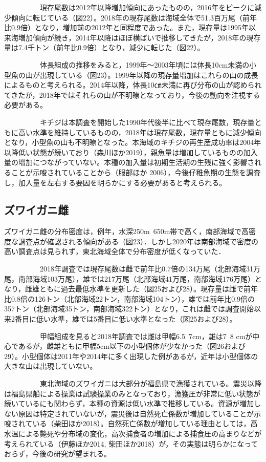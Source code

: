 \documentclass[11pt]{article} %
\begin{document}
\begin{linenumbers}
\ \ \ \ \ \ \ \ \ \ 
現存尾数は2012年以降増加傾向にあったものの，2016年をピークに減少傾向に転じている（図22）。2018年の現存尾数は海域全体で51.3百万尾（前年比0.9倍）となり，増加前の2012年と同程度であった。また，現存量は1995年以来海増加傾向が続き，2014年以降はほぼ横ばいで推移してきたが，2018年の現存量は7.4千トン（前年比0.9倍）となり，減少に転じた（図22）。

\ \ \ \ \ \ \ \ \ \ 
体長組成の推移をみると，1999年～2003年頃には体長10cm未満の小型魚の山が出現している（図23）。1999年以降の現存量増加はこれらの山の成長によるものと考えられる。2014年以降，体長10㎝未満に再び分布の山が認められてきたが，2018年ではそれらの山が不明瞭となっており，今後の動向を注視する必要がある。

\ \ \ \ \ \ \ \ \ \ 
キチジは本調査を開始した1990年代後半に比べて現存尾数，現存量ともに高い水準を維持しているものの，2018年は現存尾数，現存量ともに減少傾向となり，小型魚の山も不明瞭となった。本海域のキチジの再生産成功率は2004年以降低い状態が続いており（森川ほか2019），親魚量は増加しているものの加入量の増加につながっていない。本種の加入量は初期生活期の生残に強く影響されることが示唆されていることから（服部ほか 2006），今後仔稚魚期の生態を調査し，加入量を左右する要因を明らかにする必要があると考えられる。

\subsection{ズワイガニ雌}
ズワイガニ雌の分布密度は，例年，水深250m~650m帯で高く，南部海域で高密度な調査点が確認される傾向がある（図23）．しかし2020年は南部海域で密度の高い調査点は見られず，東北海域全体で分布密度が低くなっていた．

\ \ \ \ \ \ \ \ \ \ 
2018年調査では現存尾数は雌で前年比0.7倍の134万尾（北部海域31万尾，南部海域103万尾），雄では217万尾（北部海域41万尾，南部海域176万尾）となり，雌雄ともに過去最低水準を更新した（図25および28）。現存量は雌で前年比0.8倍の126トン（北部海域22トン，南部海域104トン），雄では前年比0.9倍の357トン（北部海域35トン，南部海域322トン）となり，これは雌では調査開始以来2番目に低い水準，雄では5番目に低い水準となった（図25および28）。

\ \ \ \ \ \ \ \ \ \ 
甲幅組成を見ると2018年調査では雌は甲幅6.5~7cm，雄は7~8 cmが中心であるが，雌雄ともに甲幅5cm以下の小型個体が少なかった（図26および29）。小型個体は2011年や2014年に多く出現した例があるが，近年は小型個体の大きな山は出現していない。

\ \ \ \ \ \ \ \ \ \ 
東北海域のズワイガニは大部分が福島県で漁獲されている。震災以降は福島県船による操業は試験操業のみとなっており，漁獲圧が非常に低い状態が続いているにも関わらず，本種の資源は低い水準で推移している。資源が増加しない原因は特定されていないが，震災後は自然死亡係数が増加していることが示唆されている（柴田ほか2018）。自然死亡係数が増加している理由としては，高水温による斃死や分布域の変化，高次捕食者の増加による捕食圧の高まりなどが考えられている（伊藤ほか2014, 柴田ほか2018）が，その実態は明らかになっておらず，今後の研究が望まれる。


\end{linenumbers}
\end{document}
